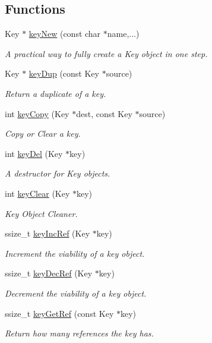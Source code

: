 \subsection*{Functions}
\begin{DoxyCompactItemize}
\item 
Key $\ast$ \hyperlink{group__key_gad23c65b44bf48d773759e1f9a4d43b89}{key\+New} (const char $\ast$name,...)
\begin{DoxyCompactList}\small\item\em A practical way to fully create a Key object in one step. \end{DoxyCompactList}\item 
Key $\ast$ \hyperlink{group__key_gae6ec6a60cc4b8c1463fa08623d056ce3}{key\+Dup} (const Key $\ast$source)
\begin{DoxyCompactList}\small\item\em Return a duplicate of a key. \end{DoxyCompactList}\item 
int \hyperlink{group__key_ga6a12cbbe656a1ad9f41b8c681d7a2f92}{key\+Copy} (Key $\ast$dest, const Key $\ast$source)
\begin{DoxyCompactList}\small\item\em Copy or Clear a key. \end{DoxyCompactList}\item 
int \hyperlink{group__key_ga3df95bbc2494e3e6703ece5639be5bb1}{key\+Del} (Key $\ast$key)
\begin{DoxyCompactList}\small\item\em A destructor for Key objects. \end{DoxyCompactList}\item 
int \hyperlink{group__key_gab2242311a36bbc0520e0d36895107ec1}{key\+Clear} (Key $\ast$key)
\begin{DoxyCompactList}\small\item\em Key Object Cleaner. \end{DoxyCompactList}\item 
ssize\+\_\+t \hyperlink{group__key_ga6970a6f254d67af7e39f8e469bb162f1}{key\+Inc\+Ref} (Key $\ast$key)
\begin{DoxyCompactList}\small\item\em Increment the viability of a key object. \end{DoxyCompactList}\item 
ssize\+\_\+t \hyperlink{group__key_ga2c6433ca22109e4e141946057eccb283}{key\+Dec\+Ref} (Key $\ast$key)
\begin{DoxyCompactList}\small\item\em Decrement the viability of a key object. \end{DoxyCompactList}\item 
ssize\+\_\+t \hyperlink{group__key_ga4aabc4272506dd63161db2bbb42de8ae}{key\+Get\+Ref} (const Key $\ast$key)
\begin{DoxyCompactList}\small\item\em Return how many references the key has. \end{DoxyCompactList}\end{DoxyCompactItemize}


